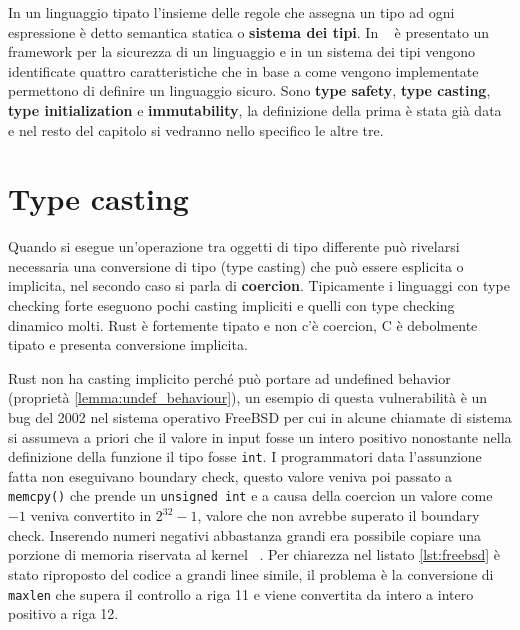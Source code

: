 \documentclass[Lau,binding=0.6cm]{sapthesis}
\newcommand{\textcode}[1]{\colorbox{backcolour}{\texttt{#1}}}
\begin{document}
In un linguaggio tipato l'insieme delle regole che assegna un tipo ad ogni espressione è detto semantica statica o \textbf{sistema dei tipi}.
In ~\cite{security_framework} è presentato un framework per la sicurezza di un linguaggio e in un sistema dei tipi vengono identificate quattro caratteristiche che in base a come vengono implementate permettono di definire un linguaggio sicuro.
Sono \textbf{type safety}, \textbf{type casting}, \textbf{type initialization} e \textbf{immutability}, la definizione della prima è stata già data e nel resto del capitolo si vedranno nello specifico le altre tre.


\section{Type casting}
Quando si esegue un'operazione tra oggetti di tipo differente può rivelarsi necessaria una conversione di tipo (type casting) che può essere esplicita o implicita, nel secondo caso si parla di \textbf{coercion}.
Tipicamente i linguaggi con type checking forte eseguono pochi casting impliciti e quelli con type checking dinamico molti.
Rust è fortemente tipato e non c'è coercion, C è debolmente tipato e presenta conversione implicita.   







Rust non ha casting implicito perché può portare ad undefined behavior (proprietà \ref{lemma:undef_behaviour}), un esempio di questa vulnerabilità è un bug del 2002 nel sistema operativo FreeBSD per cui in alcune chiamate di sistema si assumeva a priori che il valore in input fosse un intero positivo nonostante nella definizione della funzione il tipo fosse \textcode{int}.
I programmatori data l'assunzione fatta non eseguivano boundary check, questo valore veniva poi passato a \textcode{memcpy()} che prende un \textcode{unsigned int} e a causa della coercion un valore come $ -1 $ veniva convertito in $ 2^{32}-1 $, valore che non avrebbe superato il boundary check.
Inserendo numeri negativi abbastanza grandi era possibile copiare una porzione di memoria riservata al kernel ~\cite{freeBSD_vulnerability}.
Per chiarezza nel listato \ref{lst:freebsd} è stato riproposto del codice a grandi linee simile, il problema è la conversione di \texttt{maxlen} che supera il controllo a riga 11 e viene convertita da intero a intero positivo a riga 12. 
\end{document}
